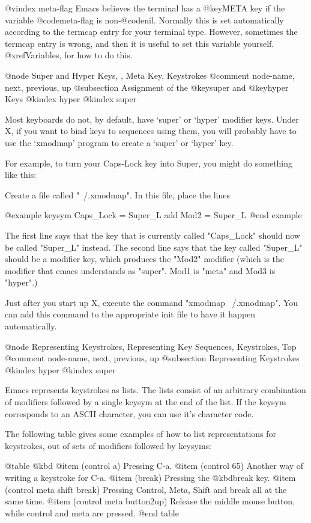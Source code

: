 {{@vindex meta-flag
  Emacs believes the terminal has a @key{META} key if the variable
@code{meta-flag} is non-@code{nil}.  Normally this is set automatically
according to the termcap entry for your terminal type.  However, sometimes
the termcap entry is wrong, and then it is useful to set this variable
yourself.  @xref{Variables}, for how to do this.

@node Super and Hyper Keys, , Meta Key, Keystrokes
@comment  node-name,  next,  previous,  up
@subsection Assignment of the @key{super} and @key{hyper} Keys
@kindex hyper
@kindex super

  Most keyboards do not, by default, have `super' or `hyper' modifier
keys.  Under X, if you want to bind keys to sequences using them, you
will probably have to use the `xmodmap' program to create a `super' or
`hyper' key.

  For example, to turn your Caps-Lock key into Super, you might do something
like this:

  Create a file called "~/.xmodmap".  In this file, place the lines

@example
	keysym Caps_Lock = Super_L
	add Mod2 = Super_L
@end example

The first line says that the key that is currently called "Caps_Lock" should
now be called "Super_L" instead.  The second line says that the key called
"Super_L" should be a modifier key, which produces the "Mod2" modifier (which
is the modifier that emacs understands as "super".  Mod1 is "meta" and Mod3 is
"hyper".)

Just after you start up X, execute the command "xmodmap ~/.xmodmap".  You can
add this command to the appropriate init file to have it happen automatically.



@node Representing Keystrokes, Representing Key Sequences, Keystrokes, Top
@comment  node-name,  next,  previous,  up
@subsection Representing Keystrokes
@kindex hyper
@kindex super

  Emacs represents keystrokes as lists. The lists consist of an
arbitrary combination of modifiers followed by a single keysym at the end of
the list.  If the keysym corresponds to an ASCII character, you can use
it's character code.

  The following table gives some examples of how to list representations
for keystrokes, out of sets of modifiers followed by keysyms:

@table @kbd
@item (control a)
Pressing C-a.
@item (control 65)
Another way of writing a keystroke for C-a.
@item (break)
Pressing the @kbd{break} key.
@item (control meta shift break)
Pressing Control, Meta, Shift and break all at the same time.
@item (control meta button2up)
Release the middle mouse button, while control and meta are pressed.
@end table

}}
